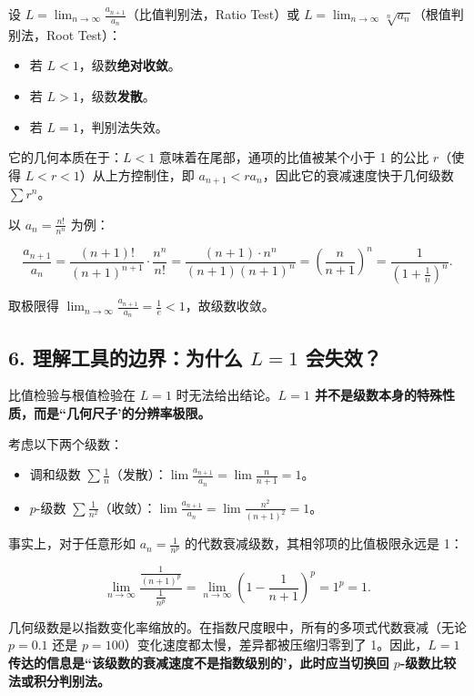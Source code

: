 设 \(L = \lim_{n\to\infty} \frac{a_{n+1}}{a_n}\)（比值判别法，Ratio Test）或 \(L = \lim_{n\to\infty} \sqrt[n]{a_n}\)（根值判别法，Root Test）：
\begin{itemize}
    \item 若 \(L < 1\)，级数\textbf{绝对收敛}。
    \item 若 \(L > 1\)，级数\textbf{发散}。
    \item 若 \(L = 1\)，判别法失效。
\end{itemize}

它的几何本质在于：\(L < 1\) 意味着在尾部，通项的比值被某个小于 1 的公比 \(r\)（使得 \(L < r < 1\)）从上方控制住，即 \(a_{n+1} < r a_n\)，因此它的衰减速度快于几何级数 \(\sum r^n\)。

以 \(a_n = \frac{n!}{n^n}\) 为例：

\[
\frac{a_{n+1}}{a_n} = \frac{(n+1)!}{(n+1)^{n+1}} \cdot \frac{n^n}{n!} = \frac{(n+1) \cdot n^n}{(n+1)(n+1)^n} = \left(\frac{n}{n+1}\right)^n = \frac{1}{\left(1 + \frac{1}{n}\right)^n}.
\]

取极限得 \(\lim_{n\to\infty} \frac{a_{n+1}}{a_n} = \frac{1}{e} < 1\)，故级数收敛。


\subsection{6. 理解工具的边界：为什么 \texorpdfstring{\(L=1\)}{L=1} 会失效？}

比值检验与根值检验在 \(L=1\) 时无法给出结论。\textbf{\(L=1\) 并不是级数本身的特殊性质，而是``几何尺子'的分辨率极限。}

考虑以下两个级数：
\begin{itemize}
    \item 调和级数 \(\sum \frac{1}{n}\)（发散）：\(\lim \frac{a_{n+1}}{a_n} = \lim \frac{n}{n+1} = 1\)。
    \item \(p\)-级数 \(\sum \frac{1}{n^2}\)（收敛）：\(\lim \frac{a_{n+1}}{a_n} = \lim \frac{n^2}{(n+1)^2} = 1\)。
\end{itemize}

事实上，对于任意形如 \(a_n = \frac{1}{n^p}\) 的代数衰减级数，其相邻项的比值极限永远是 1：

\[
\lim_{n\to\infty} \frac{\frac{1}{(n+1)^p}}{\frac{1}{n^p}} = \lim_{n\to\infty} \left(1 - \frac{1}{n+1}\right)^p = 1^p = 1.
\]

几何级数是以指数变化率缩放的。在指数尺度眼中，所有的多项式代数衰减（无论 \(p=0.1\) 还是 \(p=100\)）变化速度都太慢，差异都被压缩归零到了 1。因此，\textbf{\(L=1\) 传达的信息是``该级数的衰减速度不是指数级别的'，此时应当切换回 \(p\)-级数比较法或积分判别法。}


